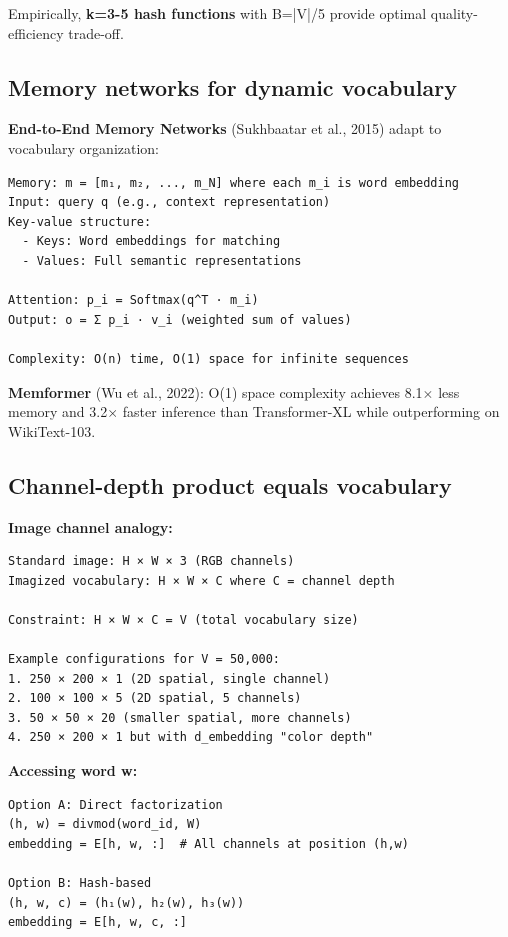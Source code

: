 \documentclass[11pt]{article}
\begin{document}
Empirically, \textbf{k=3-5 hash functions} with B=|V|/5 provide optimal quality-efficiency trade-off.

\subsection{Memory networks for dynamic vocabulary}

\textbf{End-to-End Memory Networks} (Sukhbaatar et al., 2015) adapt to vocabulary organization:

\begin{verbatim}
Memory: m = [m₁, m₂, ..., m_N] where each m_i is word embedding
Input: query q (e.g., context representation)
Key-value structure:
  - Keys: Word embeddings for matching
  - Values: Full semantic representations

Attention: p_i = Softmax(q^T · m_i)
Output: o = Σ p_i · v_i (weighted sum of values)

Complexity: O(n) time, O(1) space for infinite sequences
\end{verbatim}

\textbf{Memformer} (Wu et al., 2022): O(1) space complexity achieves 8.1\(\times\) less memory and 3.2\(\times\) faster inference than Transformer-XL while outperforming on WikiText-103.

\subsection{Channel-depth product equals vocabulary}

\textbf{Image channel analogy:}

\begin{verbatim}
Standard image: H × W × 3 (RGB channels)
Imagized vocabulary: H × W × C where C = channel depth

Constraint: H × W × C = V (total vocabulary size)

Example configurations for V = 50,000:
1. 250 × 200 × 1 (2D spatial, single channel)
2. 100 × 100 × 5 (2D spatial, 5 channels)
3. 50 × 50 × 20 (smaller spatial, more channels)
4. 250 × 200 × 1 but with d_embedding "color depth"
\end{verbatim}

\textbf{Accessing word w:}

\begin{verbatim}
Option A: Direct factorization
(h, w) = divmod(word_id, W)
embedding = E[h, w, :]  # All channels at position (h,w)

Option B: Hash-based
(h, w, c) = (h₁(w), h₂(w), h₃(w))
embedding = E[h, w, c, :]
\end{verbatim}
\end{document}
